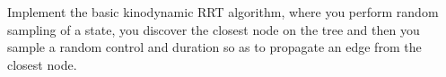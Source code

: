 \question{[5]}

Implement the basic kinodynamic RRT algorithm, where you perform random
sampling of a state, you discover the closest node on the tree and then you
sample a random control and duration so as to propagate an edge from the
closest node.